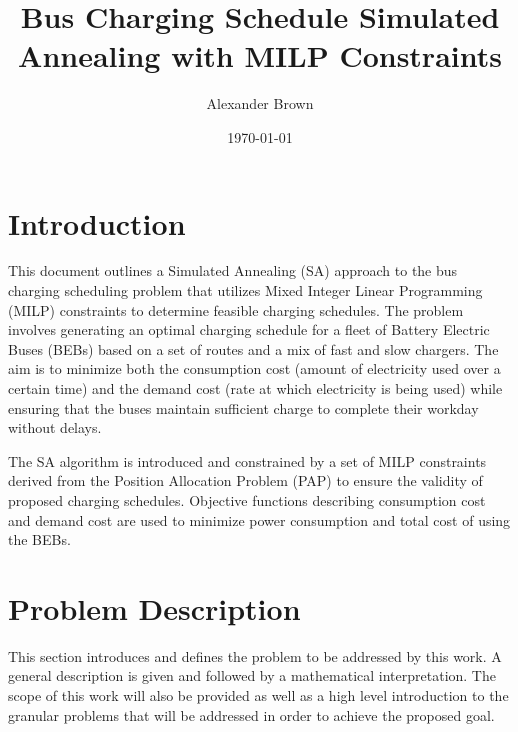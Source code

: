 \documentclass[11pt,a4paper,final]{article}
\author{Alexander Brown}
\date{\today}
\title{Bus Charging Schedule Simulated Annealing with MILP Constraints}
\begin{document}
\maketitle
\tableofcontents

\parskip 3mm                                %
\let\ref\autoref                            %

\section{Introduction}
\label{sec:introduction}
This document outlines a Simulated Annealing (SA) approach to the bus charging scheduling problem that utilizes Mixed
Integer Linear Programming (MILP) constraints to determine feasible charging schedules. The problem involves generating
an optimal charging schedule for a fleet of Battery Electric Buses (BEBs) based on a set of routes and a mix of fast and
slow chargers. The aim is to minimize both the consumption cost (amount of electricity used over a certain time) and the
demand cost (rate at which electricity is being used) while ensuring that the buses maintain sufficient charge to
complete their workday without delays.

The SA algorithm is introduced and constrained by a set of MILP constraints derived from the Position Allocation Problem
(PAP) to ensure the validity of proposed charging schedules. Objective functions describing consumption cost and demand
cost are used to minimize power consumption and total cost of using the BEBs.
\section{Problem Description}
\label{sec:problem-description}
This section introduces and defines the problem to be addressed by this work. A general description is given and
followed by a mathematical interpretation. The scope of this work will also be provided as well as a high level
introduction to the granular problems that will be addressed in order to achieve the proposed goal.
\end{document}
